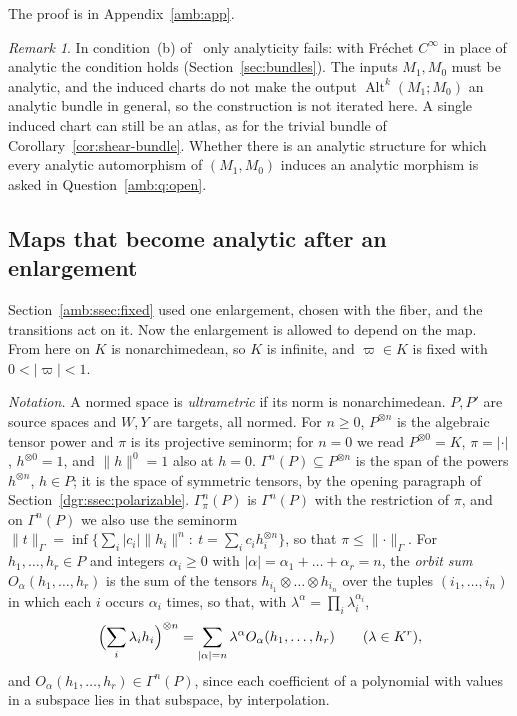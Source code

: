 \documentclass[11pt]{amsart}
\theoremstyle{definition}
\theoremstyle{remark}
\newtheorem{remark}[theorem]{Remark}
\numberwithin{equation}{section}
\newcommand{\Alt}{\operatorname{Alt}}
\newcommand{\abs}[1]{\lvert #1\rvert}
\newcommand{\norm}[1]{\lVert #1\rVert}
\theoremstyle{plain}
\theoremstyle{definition}
\theoremstyle{plain}
\begin{document}
The proof is in Appendix~\ref{amb:app}.

\begin{remark}\label{amb:rem:limits}
In condition~(b) of~\cite[n\textsuperscript{o}~7.6.1]{Bou} only analyticity fails: with Fr\'echet $C^\infty$ in place of analytic the condition holds (Section~\ref{sec:bundles}). The inputs $M_1,M_0$ must be analytic, and the induced charts do not make the output $\Alt^k(M_1;M_0)$ an analytic bundle in general, so the construction is not iterated here. A single induced chart can still be an atlas, as for the trivial bundle of Corollary~\ref{cor:shear-bundle}. Whether there is an analytic structure for which every analytic automorphism of $(M_1,M_0)$ induces an analytic morphism is asked in Question~\ref{amb:q:open}.
\end{remark}

\subsection{Maps that become analytic after an enlargement}\label{amb:ssec:some-j}

Section~\ref{amb:ssec:fixed} used one enlargement, chosen with the fiber, and the transitions act on it. Now the enlargement is allowed to depend on the map. From here on $K$ is nonarchimedean, so $K$ is infinite, and $\varpi\in K$ is fixed with $0<\abs\varpi<1$.

\emph{Notation.} A normed space is \emph{ultrametric} if its norm is nonarchimedean. $P,P'$ are source spaces and $W,Y$ are targets, all normed. For $n\ge0$, $P^{\otimes n}$ is the algebraic tensor power and $\pi$ is its projective seminorm; for $n=0$ we read $P^{\otimes0}=K$, $\pi=\abs\cdot$, $h^{\otimes0}=1$, and $\norm h^0=1$ also at $h=0$. $\Gamma^n(P)\subseteq P^{\otimes n}$ is the span of the powers $h^{\otimes n}$, $h\in P$; it is the space of symmetric tensors, by the opening paragraph of Section~\ref{dgr:ssec:polarizable}. $\Gamma^n_\pi(P)$ is $\Gamma^n(P)$ with the restriction of $\pi$, and on $\Gamma^n(P)$ we also use the seminorm $\norm t_\Gamma=\inf\{\sum_i\abs{c_i}\norm{h_i}^n:\ t=\sum_ic_ih_i^{\otimes n}\}$, so that $\pi\le\norm\cdot_\Gamma$. For $h_1,\dots,h_r\in P$ and integers $\alpha_i\ge0$ with $\abs\alpha=\alpha_1+\dots+\alpha_r=n$, the \emph{orbit sum} $O_\alpha(h_1,\dots,h_r)$ is the sum of the tensors $h_{i_1}\otimes\dots\otimes h_{i_n}$ over the tuples $(i_1,\dots,i_n)$ in which each $i$ occurs $\alpha_i$ times, so that, with $\lambda^\alpha=\prod_i\lambda_i^{\alpha_i}$,
\begin{equation}\label{amb:eq:orbit}
 \Bigl(\sum_i\lambda_ih_i\Bigr)^{\otimes n}=\sum_{\abs\alpha=n}\lambda^\alpha O_\alpha(h_1,\dots,h_r)\qquad(\lambda\in K^r),
\end{equation}
and $O_\alpha(h_1,\dots,h_r)\in\Gamma^n(P)$, since each coefficient of a polynomial with values in a subspace lies in that subspace, by interpolation.
\end{document}
